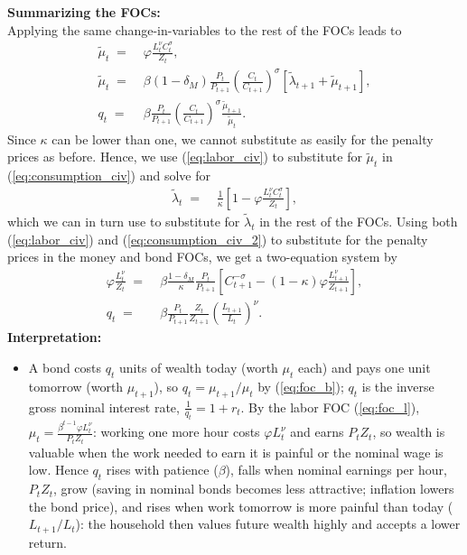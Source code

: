 \documentclass[a4paper, 12pt]{article}
\begin{document}
\begin{Answer}%
	\textbf{Summarizing the FOCs:}\\%
	Applying the same change-in-variables to the rest of the FOCs leads to%
	\begin{align}%
		\tilde{\mu}_t \; = & \; \varphi \frac{L_t^\nu C_t^\sigma}{Z_t},\label{eq:labor_civ}\\%
		\tilde{\mu}_t \; = & \; \beta \left(1-\delta_M\right)\frac{P_t}{P_{t+1}} \left(\frac{C_t}{C_{t+1}}\right)^\sigma \left[ \tilde{\lambda}_{t+1} + \tilde{\mu}_{t+1} \right],\label{eq:money_civ}\\%
		q_t \; = & \; \beta \frac{P_t}{P_{t+1}} \left(\frac{C_t}{C_{t+1}}\right)^\sigma \frac{\tilde{\mu}_{t+1}}{\tilde{\mu}_t}.\label{eq:bond_civ}%
	\end{align}%
	Since $\kappa$ can be lower than one, we cannot substitute as easily for the penalty prices as before. Hence, we use (\ref{eq:labor_civ}) to substitute for $\tilde{\mu}_t$ in (\ref{eq:consumption_civ}) and solve for%
	\begin{align}%
		\tilde{\lambda}_t \; = & \; \frac{1}{\kappa} \left[ 1 - \varphi \frac{L_t^\nu C_t^\sigma}{Z_t} \right],\label{eq:consumption_civ_2}%
	\end{align}%
	which we can in turn use to substitute for $\tilde{\lambda}_t$ in the rest of the FOCs. Using both (\ref{eq:labor_civ}) and (\ref{eq:consumption_civ_2}) to substitute for the penalty prices in the money and bond FOCs, we get a two-equation system by%
	\begin{align}%
		\varphi \frac{L_t^\nu}{Z_t} \; = & \; \beta \frac{1-\delta_M}{\kappa} \frac{P_t}{P_{t+1}} \left[ C_{t+1}^{-\sigma} - \left(1-\kappa\right) \varphi \frac{L_{t+1}^\nu}{Z_{t+1}} \right],\label{eq:labor_solved}\\%
		q_t \; = & \; \beta \frac{P_t}{P_{t+1}} \frac{Z_t}{Z_{t+1}} \left(\frac{L_{t+1}}{L_t}\right)^\nu.\label{eq:interest_solved}%
	\end{align}%
	\textbf{Interpretation:}%
	\begin{itemize}%
		\item[(\ref{eq:interest_solved})] A bond costs $q_t$ units of wealth today (worth $\mu_t$ each) and pays one unit tomorrow (worth $\mu_{t+1}$), so $q_t = \mu_{t+1}/\mu_t$ by (\ref{eq:foc_b}); $q_t$ is the inverse gross nominal interest rate, $\frac{1}{q_t} = 1 + r_t$. By the labor FOC (\ref{eq:foc_l}), $\mu_t = \frac{\beta^{t-1}\varphi L_t^\nu}{P_tZ_t}$: working one more hour costs $\varphi L_t^\nu$ and earns $P_tZ_t$, so wealth is valuable when the work needed to earn it is painful or the nominal wage is low. Hence $q_t$ rises with patience ($\beta$), falls when nominal earnings per hour, $P_tZ_t$, grow (saving in nominal bonds becomes less attractive; inflation lowers the bond price), and rises when work tomorrow is more painful than today ($L_{t+1}/L_t$): the household then values future wealth highly and accepts a lower return.%

\end{itemize}
\end{Answer}
\end{document}
